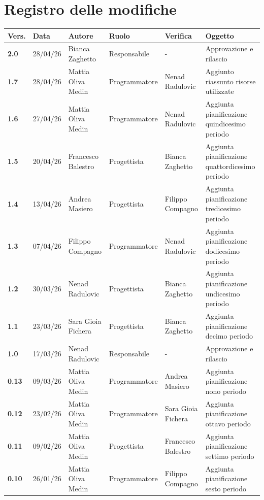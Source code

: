 \documentclass[a4paper,12pt]{article}
\begin{document}


\newpage
\section*{Registro delle modifiche}
\begin{xltabular}{\textwidth}{|l|l|X|l|X|X|}
\hline
\textbf{Vers.} & \textbf{Data} & \textbf{Autore} & \textbf{Ruolo} & \textbf{Verifica} & \textbf{Oggetto} \\
\hline
\endhead
\endfoot
\hline
\endlastfoot
\textbf{2.0} & 28/04/26 & Bianca Zaghetto & Responsabile & - & Approvazione e rilascio \\
\hline
\textbf{1.7} & 28/04/26 & Mattia Oliva Medin & Programmatore & Nenad Radulovic & Aggiunto riassunto risorse utilizzate \\
\hline
\textbf{1.6} & 27/04/26 & Mattia Oliva Medin & Programmatore & Nenad Radulovic & Aggiunta pianificazione quindicesimo periodo \\
\hline
\textbf{1.5} & 20/04/26 & Francesco Balestro & Progettista & Bianca Zaghetto & Aggiunta pianificazione quattordicesimo periodo \\
\hline
\textbf{1.4} & 13/04/26 & Andrea Masiero & Progettista & Filippo Compagno & Aggiunta pianificazione tredicesimo periodo \\
\hline
\textbf{1.3} & 07/04/26 & Filippo Compagno & Programmatore & Nenad Radulovic & Aggiunta pianificazione dodicesimo periodo \\
\hline
\textbf{1.2} & 30/03/26 & Nenad Radulovic & Progettista & Bianca Zaghetto & Aggiunta pianificazione undicesimo periodo \\
\hline
\textbf{1.1} & 23/03/26 & Sara Gioia Fichera & Progettista & Bianca Zaghetto & Aggiunta pianificazione decimo periodo \\
\hline
\textbf{1.0} & 17/03/26 & Nenad Radulovic & Responsabile & - & Approvazione e rilascio \\
\hline
\textbf{0.13} & 09/03/26 & Mattia Oliva Medin & Programmatore & Andrea Masiero & Aggiunta pianificazione nono periodo \\
\hline
\textbf{0.12} & 23/02/26 & Mattia Oliva Medin & Programmatore & Sara Gioia Fichera & Aggiunta pianificazione ottavo periodo \\
\hline
\textbf{0.11} & 09/02/26 & Mattia Oliva Medin & Progettista & Francesco Balestro & Aggiunta pianificazione settimo periodo \\
\hline
\textbf{0.10} & 26/01/26 & Mattia Oliva Medin & Programmatore & Filippo Compagno & Aggiunta pianificazione sesto periodo \\

\end{xltabular}
\end{document}
